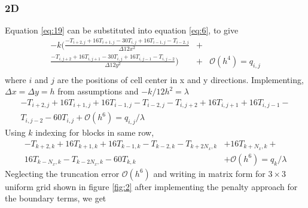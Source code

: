 \documentclass[12pt]{amsart}   %
\begin{document}
\subsubsection{2D} Equation \ref{eq:19} can be substituted into equation \ref{eq:6}, to give
\begin{eqnarray}
-k \Bigg(\frac{-T_{i+2,j}+16T_{i+1,j} -30T_{i,j} + 16T_{i-1,j} - T_{i-2,j}}{\Delta 12x^2} &+& \nonumber \\ \frac{-T_{i,j+2}+16T_{i,j+1} -30T_{i,j} +
16T_{i,j-1} - T_{i,j-2}}{\Delta 12y^2} \Bigg) &+& \mathcal{O}(h^4) = q_{i,j} \nonumber\\
\end{eqnarray}
where $i$ and $j$ are the positions of cell center in x and y directions. Implementing, $\Delta x = \Delta y = h$ from assumptions and $-k/12h^2 = \lambda$
\begin{eqnarray}
-T_{i+2,j}+16T_{i+1,j}+16T_{i-1,j} -T_{i-2,j}-T_{i,j+2}+16T_{i,j+1}+16T_{i,j-1} - \nonumber \\ T_{i,j-2} -60T_{i,j}  +\mathcal{O}(h^6) = q_{i,j}/\lambda
\end{eqnarray}
Using $k$ indexing for blocks in same row, 
\begin{eqnarray}
-T_{k+2,k}+16T_{k+1,k}+16T_{k-1,k} -T_{k-2,k}-T_{k+2N_x,k}&+16T_{k+N_x,k}+ \nonumber \\ 16T_{k-N_x,k} - T_{k-2N_x,k}-60T_{k,k} &+\mathcal{O}(h^6) = q_{k}/\lambda
\end{eqnarray}
Neglecting the truncation error $\mathcal{O}(h^6)$ and writing in matrix form for $3\times3$ uniform grid shown in figure \ref{fig:2} after implementing the penalty approach for the boundary terms, we get
\end{document}

